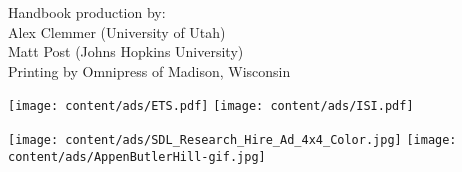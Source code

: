 \documentclass[twoside,makeidx]{book}
\begin{document}
\fancyfoot[C]{}
 
\fancyfoot[C]{\thepage}

\thispagestyle{empty}
\mbox{}

\vfill
\noindent Handbook production by: \\ 
\indent Alex Clemmer (University of Utah) \\
\indent Matt Post (Johns Hopkins University) \\  
Printing by Omnipress of Madison, Wisconsin
\newpage

\frontmatter

\clearpage

\clearpage

\clearpage%
\setheaders{}{}

\clearpage
%
\clearpage%
\setheaders{}{}

\setcounter{tocdepth}{2}
\tableofcontents
\mainmatter
\pagestyle{fancy}

%
\clearpage




% 
%
% 
%  
%  
%  
% 


\cleardoublepage
{}
\printindex

\clearpage
{}
\begin{center}
  \texttt{[image: content/ads/ETS.pdf]}
  \vfill
  \texttt{[image: content/ads/ISI.pdf]}
\end{center}

\newpage
\begin{center}
  \texttt{[image: content/ads/SDL\_Research\_Hire\_Ad\_4x4\_Color.jpg]}
  \vfill
  \texttt{[image: content/ads/AppenButlerHill-gif.jpg]}
\end{center}





\end{document}
